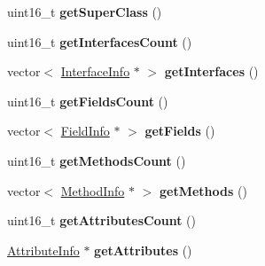 \begin{DoxyCompactItemize}
\item 
uint16\+\_\+t {\bfseries get\+Super\+Class} ()\hypertarget{classClassFile_a3fe451508fa72823e9d2879e82257d71}{}\label{classClassFile_a3fe451508fa72823e9d2879e82257d71}

\item 
uint16\+\_\+t {\bfseries get\+Interfaces\+Count} ()\hypertarget{classClassFile_a959e59776547f71b8596f7ac21ade1a8}{}\label{classClassFile_a959e59776547f71b8596f7ac21ade1a8}

\item 
vector$<$ \hyperlink{classInterfaceInfo}{Interface\+Info} $\ast$ $>$ {\bfseries get\+Interfaces} ()\hypertarget{classClassFile_a1b0d4ceab8ba1bacf48167e34d9f9697}{}\label{classClassFile_a1b0d4ceab8ba1bacf48167e34d9f9697}

\item 
uint16\+\_\+t {\bfseries get\+Fields\+Count} ()\hypertarget{classClassFile_ad222ea747904bb555c9b75adea49b946}{}\label{classClassFile_ad222ea747904bb555c9b75adea49b946}

\item 
vector$<$ \hyperlink{classFieldInfo}{Field\+Info} $\ast$ $>$ {\bfseries get\+Fields} ()\hypertarget{classClassFile_ab176b9637fc6030553a2dd427a128065}{}\label{classClassFile_ab176b9637fc6030553a2dd427a128065}

\item 
uint16\+\_\+t {\bfseries get\+Methods\+Count} ()\hypertarget{classClassFile_ab39d5edd6b3f994b4d5027cce4cf535f}{}\label{classClassFile_ab39d5edd6b3f994b4d5027cce4cf535f}

\item 
vector$<$ \hyperlink{classMethodInfo}{Method\+Info} $\ast$ $>$ {\bfseries get\+Methods} ()\hypertarget{classClassFile_a14c4a6ac978652a94720c111b47e2aa3}{}\label{classClassFile_a14c4a6ac978652a94720c111b47e2aa3}

\item 
uint16\+\_\+t {\bfseries get\+Attributes\+Count} ()\hypertarget{classClassFile_a959c28000c2602eca1414f910c720932}{}\label{classClassFile_a959c28000c2602eca1414f910c720932}

\item 
\hyperlink{classAttributeInfo}{Attribute\+Info} $\ast$ {\bfseries get\+Attributes} ()\hypertarget{classClassFile_a693c990aaba0c4c0df17bd6d54167c8d}{}\label{classClassFile_a693c990aaba0c4c0df17bd6d54167c8d}

\end{DoxyCompactItemize}
